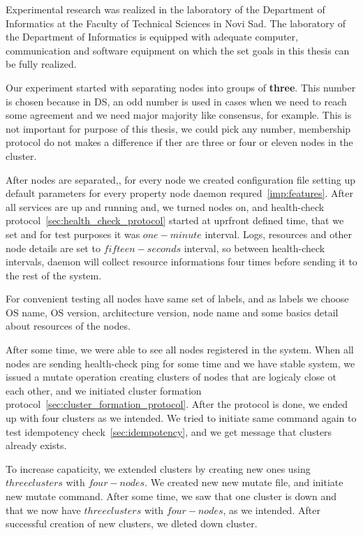 Experimental research was realized in the laboratory of the Department of Informatics at the Faculty of Technical Sciences in Novi Sad. The laboratory of the Department of Informatics is equipped with adequate computer, communication and software equipment on which the set goals in this thesis can be fully realized.

Our experiment started with separating nodes into groups of \textbf{three}. This number is chosen because in DS, an odd number is used in cases when we need to reach some agreement and we need major majority like consensus, for example. This is not important for purpose of this thesis, we could pick any number, membership protocol do not makes a difference if ther are three or four or eleven nodes in the cluster.

After nodes are separated,, for every node we created configuration file setting up default parameters for every property node daemon requred~\ref{imp:features}. After all services are up and running and, we turned nodes on, and health-check protocol~\ref{sec:health_check_protocol} started at uprfront defined time, that we set and for test purposes it was $one-minute$ interval. Logs, resources and other node details are set to $fifteen-seconds$ interval, so between health-check intervals, daemon will collect resource informations  four times before sending it to the rest of the system.

For convenient testing all nodes have same set of labels, and as labels we choose OS name, OS version, architecture version, node name and some basics detail about resources of the nodes.

After some time, we were able to see all nodes registered in the system. When all nodes are sending health-check ping for some time and we have stable system, we issued a mutate operation creating clusters of nodes that are logicaly close ot each other, and we initiated cluster formation protocol~\ref{sec:cluster_formation_protocol}. After the protocol is done, we ended up with four clusters as we intended. We tried to initiate same command again to test idempotency check~\ref{sec:idempotency}, and we get message that clusters already exists.

To increase capaticity, we extended clusters by creating new ones using $three clusters$ with $four-nodes$. We created new new mutate file, and initiate new mutate command. After some time, we saw that one cluster is down and that we now have $three clusters$ with $four-nodes$, as we intended. After successful creation of new clusters, we dleted down cluster.

